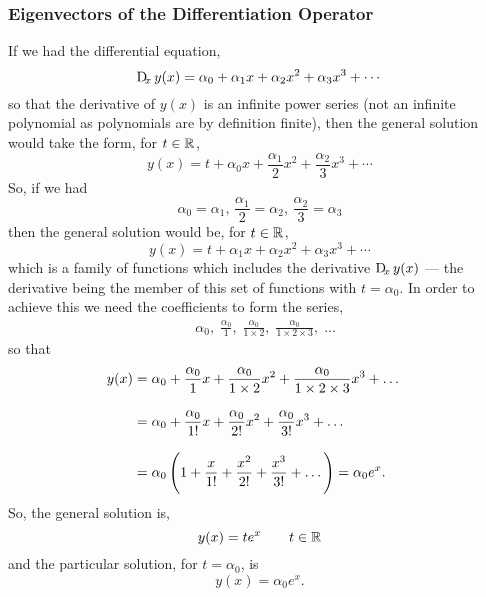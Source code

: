 \documentclass[MathsNotesBase.tex]{subfiles}
\begin{document}
{		\subsubsection{Eigenvectors of the Differentiation Operator}\label{sss:eigenvectors-of-differentiation}
		\bigskip
		If we had the differential equation,
		\begin{equation}
		\Dif_x y(x) = \alpha_0 + \alpha_1 x + \alpha_2 x^2 + \alpha_3 x^3 + \cdots
		\end{equation}
		so that the derivative of $y(x)$ is an infinite power series (not an infinite polynomial as polynomials are by definition finite), then the general solution would take the form, for ${ t \in \mathbb{R}^{} }$,
		\begin{equation}
			y(x) = t + \alpha_0 x + \frac{\alpha_1}{2} x^2 + \frac{\alpha_2}{3} x^3 + \cdots
		\end{equation}
		So, if we had
		\[ \alpha_0 = \alpha_1,\, \frac{\alpha_1}{2} = \alpha_2,\, \frac{\alpha_2}{3} = \alpha_3 \]
		then the general solution would be, for ${ t \in \mathbb{R}^{} }$,
		\begin{equation}
			y(x) = t + \alpha_1 x + \alpha_2 x^2 + \alpha_3 x^3 + \cdots
		\end{equation}
		which is a family of functions which includes the derivative ${ \Dif_x y(x) }$ --- the derivative being the member of this set of functions with ${ t = \alpha_0 }$. In order to achieve this we need the coefficients to form the series,
		\begin{align*}
		&\alpha_0,\; \frac{\alpha_0}{1},\; \frac{\alpha_0}{1 \times 2},\; \frac{\alpha_0}{1 \times 2 \times 3},\; \dots
		\end{align*}
		so that
		\begin{align*}
		y(x) &= \alpha_0 + \frac{\alpha_0}{1}x + \frac{\alpha_0}{1 \times 2}x^2 + \frac{\alpha_0}{1 \times 2 \times 3}x^3 + \dots \\[8pt]
		&= \alpha_0 + \frac{\alpha_0}{1!}x + \frac{\alpha_0}{2!}x^2 + \frac{\alpha_0}{3!}x^3 + \dots &\text{\scriptsize{}} \\[8pt]
		&= \alpha_0\left(1 + \frac{x}{1!} + \frac{x^2}{2!} + \frac{x^3}{3!} + \dots \right) = \alpha_0 e^x.
		\end{align*}
		So, the general solution is,
		\[ y(x) = t e^x \hspace{20pt} t \in \mathbb{R}^{} \]
		and the particular solution, for ${ t = \alpha_0 }$, is
		\[ y(x) = \alpha_0 e^x. \]
		
}
\end{document}

